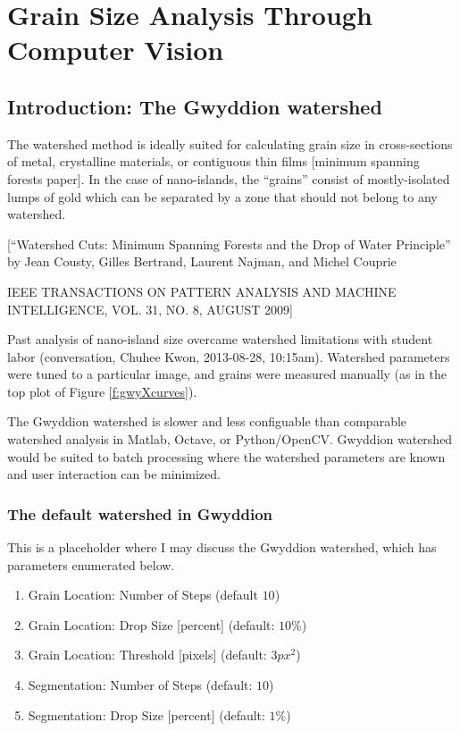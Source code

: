 \documentclass[12pt,oneside,english]{article}
\begin{document}
	\section{Grain Size Analysis Through Computer Vision}
	
	\subsection{Introduction: The Gwyddion watershed}

	The watershed method is ideally suited for calculating grain size in cross-sections of metal, crystalline materials, or contiguous thin films [minimum spanning forests paper].  
	In the case of nano-islands, the ``grains'' consist  of mostly-isolated lumps of gold which can be separated by a zone that should not belong to any watershed.
	
	[``Watershed Cuts: Minimum Spanning Forests and the Drop of Water Principle'' by 
	Jean Cousty, Gilles Bertrand, Laurent Najman, and Michel Couprie
	
	IEEE TRANSACTIONS ON PATTERN ANALYSIS AND MACHINE INTELLIGENCE, VOL. 31, NO. 8, AUGUST 2009]

	Past analysis of nano-island size overcame watershed limitations with student labor (conversation, Chuhee Kwon, 2013-08-28, 10:15am).  
	Watershed parameters were tuned to a particular image, and grains were measured manually (as in the top plot of Figure \ref{f:gwyXcurves}).  

	The Gwyddion watershed is slower and less configuable than comparable watershed analysis in Matlab, Octave, or Python/OpenCV.  
	Gwyddion watershed would be suited to batch processing where the watershed parameters are known and user interaction can be minimized.


	\subsubsection{The default watershed in Gwyddion}

	This is a placeholder where I may discuss the Gwyddion watershed, which has parameters enumerated below.
	
	\begin{enumerate}
		\item Grain Location: Number of Steps (default $10$)
		\item Grain Location: Drop Size [percent] (default: $10\%$)
		\item Grain Location: Threshold [pixels] (default: $3 px^2$)
		\item Segmentation: Number of Steps (default: $10$)
		\item Segmentation: Drop Size [percent] (default: $1\%$)
	\end{enumerate}
	
\end{document}
